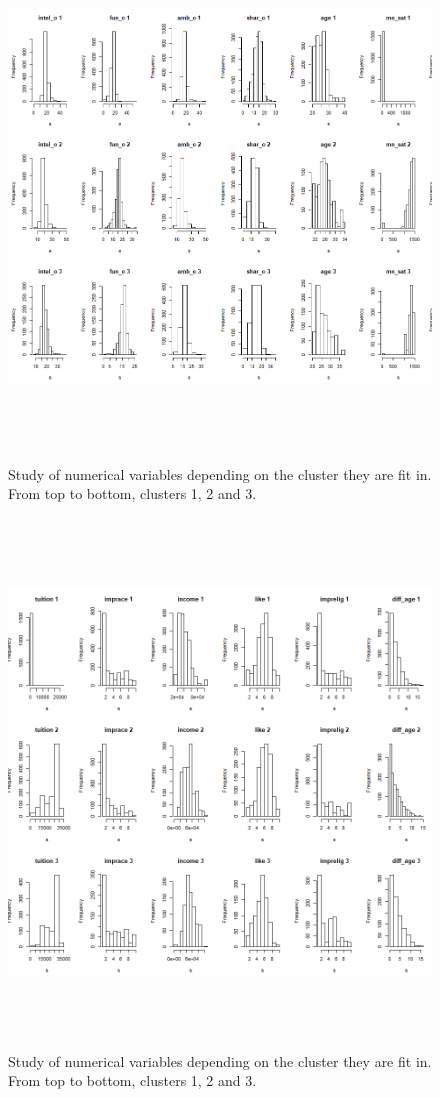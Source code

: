 \begin{figure}
  \centering
  \includegraphics[width= 16cm, height=14cm]{images/profiling/CPG_cluster_numerical_intelo_mnsat.png}
  \caption{Study of numerical variables depending on the cluster they are fit in. From top to bottom, clusters 1, 2 and 3.}
  \label{fig:indiv}
\end{figure}

\begin{figure}
  \centering
  \includegraphics[width= 16cm, height=14cm]{images/profiling/CPG_cluster_numerical_tuition_diffage.png}
  \caption{Study of numerical variables depending on the cluster they are fit in. From top to bottom, clusters 1, 2 and 3.}
  \label{fig:indiv}
\end{figure}

